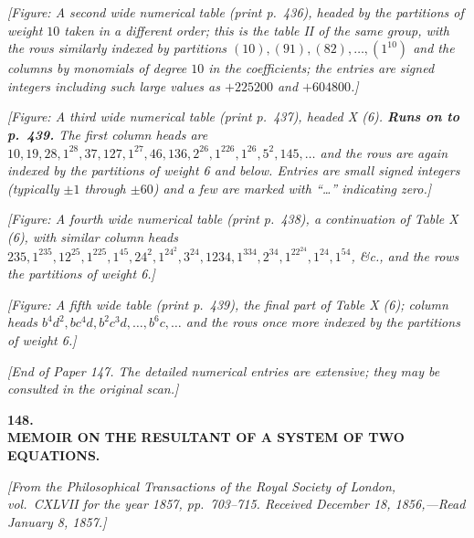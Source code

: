 \documentclass[11pt]{article}
\begin{document}
\medskip

\noindent\textit{[Figure: A second wide numerical table (print p.~436), headed by the partitions of weight $10$ taken in a different order; this is the table II of the same group, with the rows similarly indexed by partitions $(10), (91), (82), \ldots, (1^{10})$ and the columns by monomials of degree $10$ in the coefficients; the entries are signed integers including such large values as $+225200$ and $+604800$.]}

\medskip

\noindent\textit{[Figure: A third wide numerical table (print p.~437), headed X (6). \textbf{Runs on to p.~439.} The first column heads are $10, 19, 28, 1^28, 37, 127, 1^27, 46, 136, 2^26, 1^226, 1^26, 5^2, 145, \ldots$ and the rows are again indexed by the partitions of weight 6 and below. Entries are small signed integers (typically $\pm 1$ through $\pm 60$) and a few are marked with ``\ldots'' indicating zero.]}

\medskip

\noindent\textit{[Figure: A fourth wide numerical table (print p.~438), a continuation of Table X (6), with similar column heads $235, 1^235, 12^25, 1^225, 1^45, 24^2, 1^24^2, 3^24, 1234, 1^334, 2^34, 1^22^24, 1^24, 1^54$, \&c., and the rows the partitions of weight 6.]}

\medskip

\noindent\textit{[Figure: A fifth wide table (print p.~439), the final part of Table X (6); column heads $b^4d^2, bc^4d, b^2c^3d, \ldots, b^6c, \ldots$ and the rows once more indexed by the partitions of weight 6.]}

\medskip

\noindent\textit{[End of Paper 147. The detailed numerical entries are extensive; they may be consulted in the original scan.]}

\begin{center}
{\Large\bfseries 148.}\\[1ex]
{\large\bfseries MEMOIR ON THE RESULTANT OF A SYSTEM OF TWO}\\
{\large\bfseries EQUATIONS.}
\end{center}

\noindent\textit{[From the Philosophical Transactions of the Royal Society of London, vol.~CXLVII for the year 1857, pp.~703--715. Received December 18, 1856,---Read January 8, 1857.]}
\end{document}
